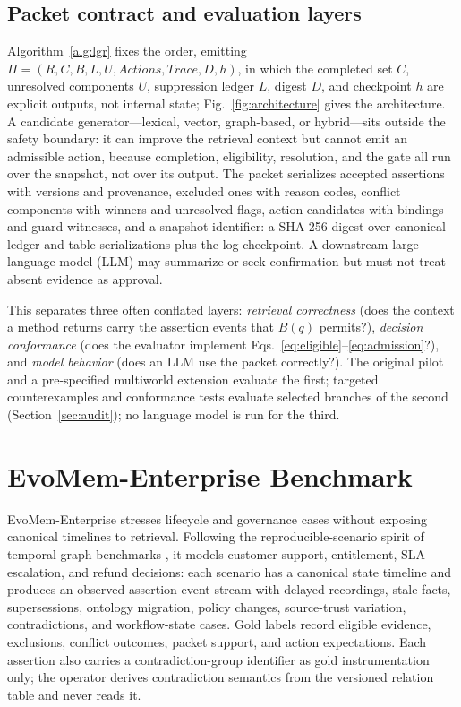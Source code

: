 \documentclass[conference]{IEEEtran}
\begin{document}
\subsection{Packet contract and evaluation layers}
Algorithm~\ref{alg:lgr} fixes the order, emitting $\Pi=(R,C,B,L,U,\mathit{Actions},\mathit{Trace},D,h)$, in which the completed set $C$, unresolved components $U$, suppression ledger $L$, digest $D$, and checkpoint $h$ are explicit outputs, not internal state; Fig.~\ref{fig:architecture} gives the architecture. A candidate generator---lexical, vector, graph-based, or hybrid---sits outside the safety boundary: it can improve the retrieval context but cannot emit an admissible action, because completion, eligibility, resolution, and the gate all run over the snapshot, not over its output. The packet serializes accepted assertions with versions and provenance, excluded ones with reason codes, conflict components with winners and unresolved flags, action candidates with bindings and guard witnesses, and a snapshot identifier: a SHA-256 digest over canonical ledger and table serializations plus the log checkpoint. A downstream large language model (LLM) may summarize or seek confirmation but must not treat absent evidence as approval.

This separates three often conflated layers: \emph{retrieval correctness} (does the context a method returns carry the assertion events that $B(q)$ permits?), \emph{decision conformance} (does the evaluator implement Eqs.~\eqref{eq:eligible}--\eqref{eq:admission}?), and \emph{model behavior} (does an LLM use the packet correctly?). The original pilot and a pre-specified multiworld extension evaluate the first; targeted counterexamples and conformance tests evaluate selected branches of the second (Section~\ref{sec:audit}); no language model is run for the third.

\section{EvoMem-Enterprise Benchmark}
\label{sec:benchmark}
EvoMem-Enterprise stresses lifecycle and governance cases without exposing canonical timelines to retrieval. Following the reproducible-scenario spirit of temporal graph benchmarks \cite{tgb}, it models customer support, entitlement, SLA escalation, and refund decisions: each scenario has a canonical state timeline and produces an observed assertion-event stream with delayed recordings, stale facts, supersessions, ontology migration, policy changes, source-trust variation, contradictions, and workflow-state cases. Gold labels record eligible evidence, exclusions, conflict outcomes, packet support, and action expectations. Each assertion also carries a contradiction-group identifier as gold instrumentation only; the operator derives contradiction semantics from the versioned relation table and never reads it.
\end{document}
